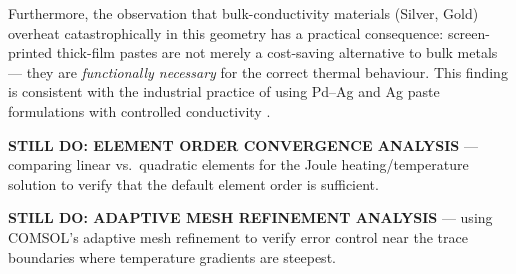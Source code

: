 Furthermore, the observation that bulk-conductivity materials (Silver, Gold) overheat catastrophically in this geometry has a practical consequence: screen-printed thick-film pastes are not merely a cost-saving alternative to bulk metals --- they are \emph{functionally necessary} for the correct thermal behaviour. This finding is consistent with the industrial practice of using Pd--Ag and Ag paste formulations with controlled conductivity \cite{prudenziati2012}.

\textbf{STILL DO: ELEMENT ORDER CONVERGENCE ANALYSIS} --- comparing linear vs.\ quadratic elements for the Joule heating/temperature solution to verify that the default element order is sufficient.

\textbf{STILL DO: ADAPTIVE MESH REFINEMENT ANALYSIS} --- using COMSOL's adaptive mesh refinement to verify error control near the trace boundaries where temperature gradients are steepest.



